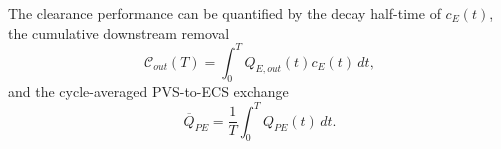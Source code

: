 \documentclass{article}
\begin{document}
The clearance performance can be quantified by the decay half-time of \(c_E(t)\), the cumulative
downstream removal
\begin{equation}
    \mathcal{C}_{out}(T)
    =
    \int_0^T Q_{E,out}(t)c_E(t)\,dt,
\end{equation}
and the cycle-averaged PVS-to-ECS exchange
\begin{equation}
    \overline{Q}_{PE}
    =
    \frac{1}{T}
    \int_0^T Q_{PE}(t)\,dt.
\end{equation}
\end{document}
